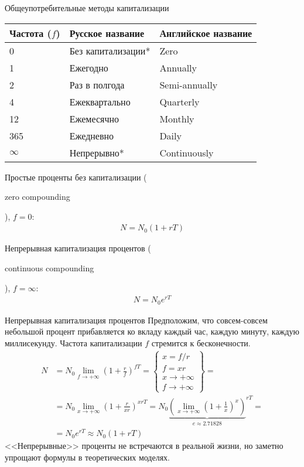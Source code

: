 \documentclass{beamer}
\newcommand{\en}[1]{\begin{otherlanguage}{english}#1\end{otherlanguage}}
\begin{document}
\begin{frame}{Общеупотребительные методы капитализации}
\centering
\begin{tabular}{l|l|l}
Частота ($f$) & Русское название & Английское название \\ \hline 
0 & Без капитализации* & Zero \\
1 & Ежегодно & Annually \\
2 & Раз в полгода & Semi-annually \\
4 & Ежеквартально & Quarterly \\
12 & Ежемесячно & Monthly \\
365 & Ежедневно & Daily \\
$\infty$ & Непрерывно* & Continuously 
\end{tabular}

\justify
Простые проценты без капитализации (\en{zero compounding}), $f=0$:
\begin{align*}
N = N_0 (1 + rT)
\end{align*}

Непрерывная капитализация процентов (\en{continuous compounding}), $f=\infty$:
\begin{align*}
N = N_0e^{rT}
\end{align*}
\end{frame}



\begin{frame}{Непрерывная капитализация процентов}
\justify
Предположим, что совсем-совсем небольшой процент прибавляется ко вкладу каждый час, каждую минуту, каждую миллисекунду. Частота капитализации $f$ стремится к бесконечности.
\begin{align*}
N &= N_0 \lim_{f \to +\infty} \left(1 + \frac{r}{f}\right)^{fT} = 
\begin{Bmatrix}x= f/r \\ f=xr \\ x \to +\infty \\ f \to +\infty\end{Bmatrix} = \\
&= N_0\lim_{x \to +\infty} \left(1 + \frac{r}{xr}\right) ^ {xrT} =
N_0{\underbrace{\left(\lim_{x \to +\infty} \left( 1 + \frac{1}{x} \right) ^ x\right)}_{e \approx 2.71828}}  ^ {rT} = \\
&= N_0e^{rT} \approx N_0(1 + rT)
\end{align*}
<<Непрерывные>> проценты не встречаются в реальной жизни, но заметно упрощают формулы в теоретических моделях.
\end{frame}
\end{document}
